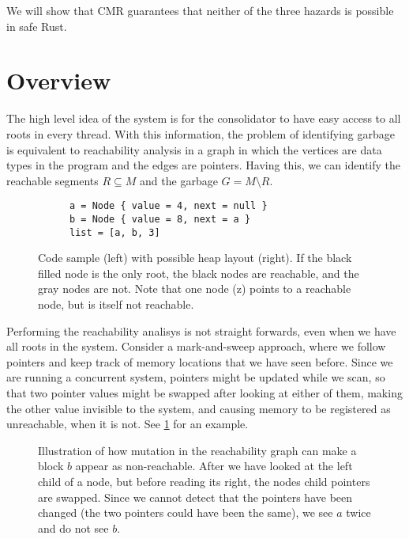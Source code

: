 We will show that CMR guarantees that neither of the three hazards is possible in safe Rust.

\section{Overview\label{sec:cmr-overview}}

The high level idea of the system is for the consolidator to have easy access to all roots in every
thread. With this information, the problem of identifying garbage is equivalent to reachability
analysis in a graph in which the vertices are data types in the program and the edges are pointers.
 Having this, we can
identify the reachable segments $R \subseteq M$ and the garbage $G = M \setminus R$.

\begin{figure}[ht]
  \centering
  \begin{subfigure}{0.45\textwidth}
    \begin{lstlisting}
a = Node { value = 4, next = null }
b = Node { value = 8, next = a }
list = [a, b, 3]
    \end{lstlisting}
  \end{subfigure}
  \hfill
  \begin{subfigure}{0.45\textwidth}
    
  \end{subfigure}
  \caption{Code sample (left) with possible heap layout (right). If the black filled node is the
  only root, the black nodes are reachable, and the gray nodes are not. Note that one node (z)
  points to a reachable node, but is itself not reachable.}
\end{figure}

Performing the reachability analisys is not straight forwards, even when we have all roots in the
system. Consider a mark-and-sweep approach, where we follow pointers and keep track of memory
locations that we have seen before. Since we are running a concurrent system, pointers might be
updated while we scan, so that two pointer values might be swapped after looking at either of them,
making the other value invisible to the system, and causing memory to be registered as unreachable,
when it is not. See \cref{fig:pointer-swap} for an example.

\begin{figure}[ht]
  \centering
  
  \caption{Illustration of how mutation in the reachability graph can make a block $b$ appear as
  non-reachable. After we have looked at the left child of a node, but before reading its right,
  the nodes child pointers are swapped. Since we cannot detect that the pointers have been changed
  (the two pointers could have been the same), we see $a$ twice and do not see $b$.%
  \label{fig:pointer-swap}}
\end{figure}

